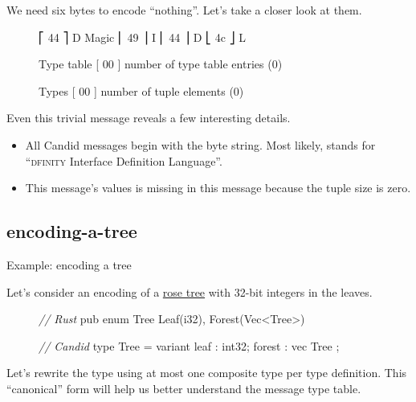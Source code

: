 \documentclass{article}
\begin{document}
We need six bytes to encode ``nothing''.
Let's take a closer look at them.

\begin{figure}
\begin{code}[ascii]
           ⎡ 44 ⎤ D
    Magic  ⎢ 49 ⎥ I
           ⎢ 44 ⎥ D
           ⎣ 4c ⎦ L

Type table [ 00 ] number of type table entries (0)

    Types  [ 00 ] number of tuple elements (0)
\end{code}
\end{figure}

Even this trivial message reveals a few interesting details.

\begin{itemize}
    \item
    All Candid messages begin with the  byte string.
    Most likely,  stands for ``\textsc{dfinity} Interface Definition Language''.
    \item
    This message's values is missing in this message because the tuple size is zero.
\end{itemize}

\subsection{encoding-a-tree}{Example: encoding a tree}

Let's consider an encoding of a \href{https://en.wikipedia.org/wiki/Rose_tree}{rose tree} with 32-bit integers in the leaves.

\begin{figure}
\begin{code}[rust]
\emph{// Rust}
pub enum Tree { Leaf(i32), Forest(Vec<Tree>) }
\end{code}
\begin{code}[candid]
\emph{// Candid}
type Tree = variant { leaf : int32; forest : vec Tree };
\end{code}
\end{figure}

Let's rewrite the  type using at most one composite type per type definition.
This ``canonical'' form will help us better understand the message type table.
\end{document}
